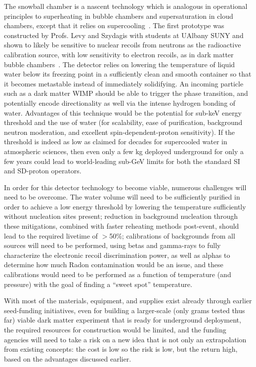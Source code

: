 The snowball chamber is a nascent technology which is analogous in operational principles to superheating in bubble chambers and supersaturation in cloud chambers, except that it relies on supercooling~\cite{szydagis2021}.  The first prototype was constructed by Profs. Levy and Szydagis with students at UAlbany SUNY and shown to likely be sensitive to nuclear recoils from neutrons as the radioactive calibration source, with low sensitivity to electron recoils, as in dark matter bubble chambers~\cite{PICO:2019vsc}. The detector relies on lowering the temperature of liquid water below its freezing point in a sufficiently clean and smooth container so that it becomes metastable instead of immediately solidifying.  An incoming particle such as a dark matter WIMP should be able to trigger the phase transition, and potentially encode directionality as well via the intense hydrogen bonding of water.  Advantages of this technique would be the potential for sub-keV energy threshold and the use of water (for scalability, ease of purification, background neutron moderation, and excellent spin-dependent-proton sensitivity).  If the threshold is indeed as low as claimed for decades for supercooled water in atmospheric sciences, then even only a few kg deployed underground for only a few years could lead to world-leading sub-GeV limits for both the standard SI and SD-proton operators.

In order for this detector technology to become viable, numerous challenges will need to be overcome.  The water volume will need to be sufficiently purified in order to achieve a low energy threshold by lowering the temperature sufficiently without nucleation sites present; reduction in background nucleation through these mitigations, combined with faster reheating methods post-event, should lead to the required livetime of $>$50\%; calibrations of backgrounds from all sources will need to be performed, using betas and gamma-rays to fully characterize the electronic recoil discrimination power, as well as alphas to determine how much Radon contamination would be an issue, and these calibrations would need to be performed as a function of temperature (and pressure) with the goal of finding a “sweet spot” temperature.

With most of the materials, equipment, and supplies exist already through earlier seed-funding initiatives, even for building a larger-scale (only grams tested thus far) viable dark matter experiment that is ready for underground deployment, the required resources for construction would be limited, and the funding agencies will need to take a risk on a new idea that is not only an extrapolation from existing concepts: the cost is low so the risk is low, but the return high, based on the advantages discussed earlier.